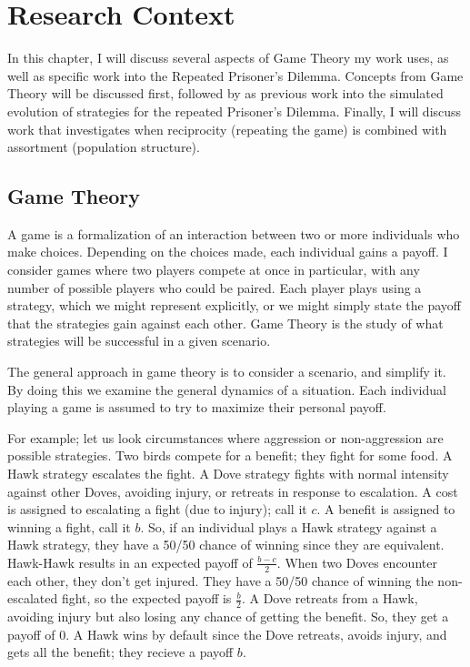 \documentclass[a4paper,11pt,bcshonoursthesis,singlespace,twoside,thesisdraft,pdflatex]{cssethesis}
\begin{document}
\chapter{Research Context}
In this chapter, I will discuss several aspects of Game Theory my work uses, as well as specific work into the Repeated Prisoner's Dilemma. 
Concepts from Game Theory will be discussed first, followed by as previous work into the simulated evolution of strategies for the repeated Prisoner's Dilemma. 
Finally, I will discuss work that investigates when reciprocity (repeating the game) is combined with assortment (population structure).
\section{Game Theory}
A game is a formalization of an interaction between two or more individuals who make choices. 
Depending on the choices made, each individual gains a payoff.  
I consider games where two players compete at once in particular, with any number of possible players who could be paired. 
Each player plays using a strategy, which we might represent explicitly, or we might simply state the payoff that the strategies gain against each other. 
Game Theory is the study of what strategies will be successful in a given scenario. 

The general approach in game theory is to consider a scenario, and simplify it. 
By doing this we examine the general dynamics of a situation. 
Each individual playing a game is assumed to try to maximize their personal payoff. 

For example; let us look circumstances where aggression or non-aggression are possible strategies. 
Two birds compete for a benefit; they fight for some food. 
A Hawk strategy escalates the fight. A Dove strategy fights with normal intensity against other Doves, avoiding injury, or retreats in response to escalation. 
A cost is assigned to escalating a fight (due to injury); call it $c$. 
A benefit is assigned to winning a fight, call it $b$. 
So, if an individual plays a Hawk strategy against a Hawk strategy, they have a 50/50 chance of winning since they are equivalent. Hawk-Hawk results in an expected payoff of $\frac{{b}-{c}}{2}$. 
When two Doves encounter each other, they don't get injured. 
They have a 50/50 chance of winning the non-escalated fight, so the expected payoff is $\frac{b}{2}$. 
A Dove retreats from a Hawk, avoiding injury but also losing any chance of getting the benefit. 
So, they get a payoff of $0$. A Hawk wins by default since the Dove retreats, avoids injury, and gets all the benefit; they recieve a payoff $b$. 
\end{document}
